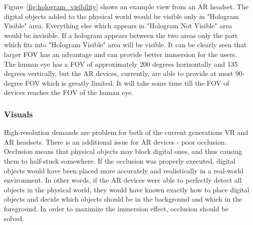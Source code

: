 \documentclass[12pt]{article}
\begin{document}
Figure~\ref{fig:hologram_visibility} shows an example view from an \ac{AR} headset. The digital objects added to the physical world would be visible only in "Hologram Visible" area. Everything else which appears in "Hologram Not Visible" area would be invisible. If a hologram appears between the two areas only the part which fits into "Hologram Visible" area will be visible. It can be clearly seen that larger \ac{FOV} has an advantage and can provide better immersion for the users. The human eye has a \ac{FOV} of approximately 200 degrees horizontally and 135 degrees vertically, but the \ac{AR} devices, currently, are able to provide at most 90-degree \ac{FOV} which is greatly limited. It will take some time till the \ac{FOV} of devices reaches the \ac{FOV} of the human eye.

\subsubsection{Visuals} \label{sec:Visuals}
High-resolution demands are problem for both of the current generations \ac{VR} and \ac{AR} headsets. There is an additional issue for \ac{AR} devices - poor occlusion. Occlusion means that physical objects may block digital ones, and thus causing them to half-stuck somewhere. If the occlusion was properly executed, digital objects would have been placed more accurately and realistically in a real-world environment. In other words, if the \ac{AR} devices were able to perfectly detect all objects in the physical world, they would have known exactly how to place digital objects and decide which objects should be in the background and which in the foreground. In order to maximize the immersion effect, occlusion should be solved.

\end{document}
